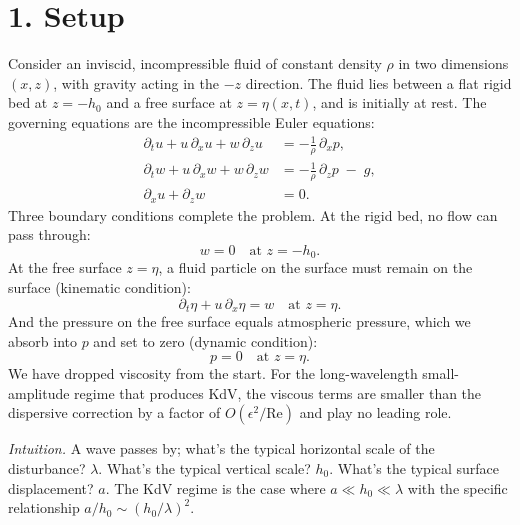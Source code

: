 \documentclass{article}
\begin{document}
\section*{1. Setup}

Consider an inviscid, incompressible fluid of constant density \(\rho\) in two dimensions \((x, z)\), with gravity acting in the \(-z\) direction. The fluid lies between a flat rigid bed at \(z = -h_0\) and a free surface at \(z = \eta(x,t)\), and is initially at rest. The governing equations are the incompressible Euler equations:
\begin{subequations}
\label{eq:euler}
\begin{align}
\partial_t u + u\, \partial_x u + w\, \partial_z u &= -\frac{1}{\rho}\, \partial_x p, \\
\partial_t w + u\, \partial_x w + w\, \partial_z w &= -\frac{1}{\rho}\, \partial_z p \;-\; g, \\
\partial_x u + \partial_z w &= 0.
\end{align}
\end{subequations}
Three boundary conditions complete the problem. At the rigid bed, no flow can pass through:
\begin{equation}
w = 0 \quad \text{at } z = -h_0.
\label{eq:bed}
\end{equation}
At the free surface \(z = \eta\), a fluid particle on the surface must remain on the surface (kinematic condition):
\begin{equation}
\partial_t \eta + u\, \partial_x \eta = w \quad \text{at } z = \eta.
\label{eq:kinematic}
\end{equation}
And the pressure on the free surface equals atmospheric pressure, which we absorb into \(p\) and set to zero (dynamic condition):
\begin{equation}
p = 0 \quad \text{at } z = \eta.
\label{eq:dynamic}
\end{equation}
We have dropped viscosity from the start. For the long-wavelength small-amplitude regime that produces KdV, the viscous terms are smaller than the dispersive correction by a factor of \(O(\epsilon^2/\mathrm{Re})\) and play no leading role.

\noindent\emph{Intuition.} A wave passes by; what's the typical horizontal scale of the disturbance? \(\lambda\). What's the typical vertical scale? \(h_0\). What's the typical surface displacement? \(a\). The KdV regime is the case where \(a \ll h_0 \ll \lambda\) with the specific relationship \(a/h_0 \sim (h_0/\lambda)^2\).
\end{document}
